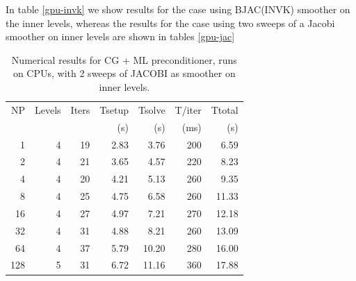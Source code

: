 \fi



In table \ref{gpu-invk} we show results for the case using BJAC(INVK)
smoother on the inner levels, whereas the results for the case using
two sweeps of a Jacobi smoother on inner levels are shown in tables
\ref{gpu-jac} 
\iffalse
\begin{table}[h!]
\centering
\caption{Numerical results for CG + ML preconditioner, runs on CPUs, with 2 sweeps of JACOBI as smoother on inner levels.}
\label{cpu-jac}

\begin{tabular}{rrrrrrr}
NP  & Levels & Iters & Tsetup & Tsolve & T/iter & Ttotal \\
    &        &       & (s)    & (s)    & (ms)   & (s)    \\
\hline
1   & 4       & 19  & 2.83  & 3.76  & 200   & 6.59    \\
2   & 4       & 21  & 3.65  & 4.57  & 220   & 8.23    \\
4   & 4       & 20  & 4.21  & 5.13  & 260   & 9.35    \\
8   & 4       & 25  & 4.75  & 6.58  & 260   & 11.33   \\
16  & 4       & 27  & 4.97  & 7.21  & 270   & 12.18   \\
32  & 4       & 31  & 4.88  & 8.21  & 260   & 13.09   \\
64  & 4       & 37  & 5.79  & 10.20 & 280   & 16.00   \\
128 & 5       & 31  & 6.72  & 11.16 & 360   & 17.88  \\
\hline
\end{tabular}
\end{table}

